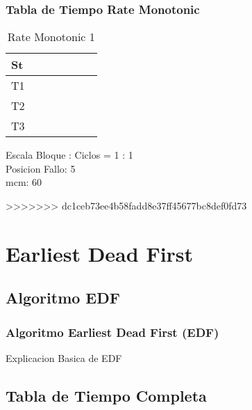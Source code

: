 \documentclass[xcolor=table]{beamer}
\begin{document}
\begin{frame} 
\frametitle{Tabla de Tiempo  Rate Monotonic } 
\begin{table} 
\centering 
\begin{tabular}{|l|l|l|l|l|l|l|} 
\hline 
St & \cellcolor{green} & \cellcolor{green} & \cellcolor{green} & \cellcolor{green} & \cellcolor{green} & \cellcolor{red} \\ \hline 
T1 & \cellcolor{blue} & & & \cellcolor{blue} & & \\ \hline 
T2 & & & & & & \\ \hline 
T3 & & \cellcolor{cyan} & \cellcolor{cyan} & & \cellcolor{cyan} & \cellcolor{cyan} \\ \hline 
\end{tabular} 
\caption{ Rate Monotonic 1 } 
\end{table} 
Escala Bloque : Ciclos = 1 : 1 \\ 
Posicion Fallo:  5 \\ 
mcm:  60 \\ 
\end{frame} 

>>>>>>> dc1ceb73ee4b58fadd8e37ff45677bc8def0fd73

\section{Earliest Dead First}

\subsection{Algoritmo EDF}

\begin{frame} 
\frametitle{Algoritmo Earliest Dead First (EDF)} 
Explicacion Basica de EDF \\
\end{frame}

\subsection{Tabla de Tiempo Completa} 
\end{document}
